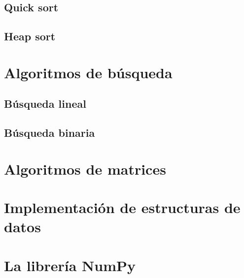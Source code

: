 \documentclass{report}
\begin{document}
\section{Quick sort}

\section{Heap sort}

\clearpage\chapter{Algoritmos de búsqueda}

\section{Búsqueda lineal}

\section{Búsqueda binaria}

\clearpage\chapter{Algoritmos de matrices}

\clearpage\chapter{Implementación de estructuras de datos}

\clearpage\chapter{La librería NumPy}
\end{document}
